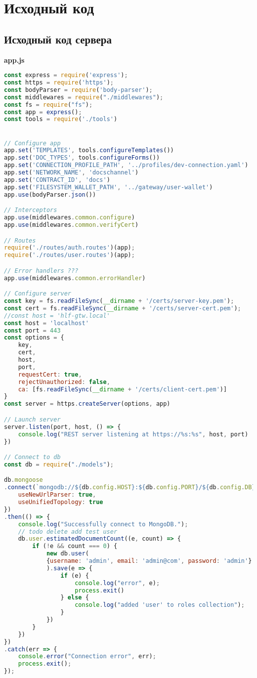 


\chapter{Исходный код} \label{app:B}

\section{Исходный код сервера}\label{app:B1}
\textbf{app.js}
\begin{lstlisting}[language=JavaScript]
const express = require('express');
const https = require('https');
const bodyParser = require('body-parser');
const middlewares = require("./middlewares");
const fs = require("fs");
const app = express();
const tools = require('./tools')


// Configure app
app.set('TEMPLATES', tools.configureTemplates())
app.set('DOC_TYPES', tools.configureForms())
app.set('CONNECTION_PROFILE_PATH', '../profiles/dev-connection.yaml')
app.set('NETWORK_NAME', 'docschannel')
app.set('CONTRACT_ID', 'docs')
app.set('FILESYSTEM_WALLET_PATH', '../gateway/user-wallet')
app.use(bodyParser.json())

// Interceptors
app.use(middlewares.common.configure)
app.use(middlewares.common.verifyCert)

// Routes
require('./routes/auth.routes')(app);
require('./routes/user.routes')(app);

// Error handlers ???
app.use(middlewares.common.errorHandler)

// Configure server
const key = fs.readFileSync(__dirname + '/certs/server-key.pem');
const cert = fs.readFileSync(__dirname + '/certs/server-cert.pem');
//const host = 'hlf-gtw.local'
const host = 'localhost'
const port = 443
const options = {
	key,
	cert,
	host,
	port,
	requestCert: true,
	rejectUnauthorized: false,
	ca: [fs.readFileSync(__dirname + '/certs/client-cert.pem')]
}
const server = https.createServer(options, app)

// Launch server
server.listen(port, host, () => {
	console.log("REST server listening at https://%s:%s", host, port)
})

// Connect to db
const db = require("./models");

db.mongoose
.connect(`mongodb://${db.config.HOST}:${db.config.PORT}/${db.config.DB}`, {
	useNewUrlParser: true,
	useUnifiedTopology: true
})
.then(() => {
	console.log("Successfully connect to MongoDB.");
	// todo delete add test user
	db.user.estimatedDocumentCount((e, count) => {
		if (!e && count === 0) {
			new db.user(
			{username: 'admin', email: 'admin@com', password: 'admin'}
			).save(e => {
				if (e) {
					console.log("error", e);
					process.exit()
				} else {
					console.log("added 'user' to roles collection");
				}
			})
		}
	})
})
.catch(err => {
	console.error("Connection error", err);
	process.exit();
});
\end{lstlisting}

